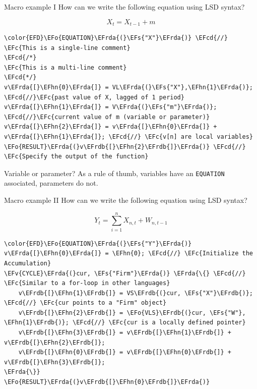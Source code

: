 \documentclass[bigger,aspectratio=169]{beamer}
\newcommand{\EFc}[1]{\textcolor{EFc}{#1}} %
\newcommand{\EFcd}[1]{\textcolor{EFcd}{#1}} %
\newcommand{\EFs}[1]{\textcolor{EFs}{#1}} %
\newcommand{\EFv}[1]{\textcolor{EFv}{#1}} %
\newcommand{\EFo}[1]{\textcolor{EFo}{#1}} %
\newcommand{\EFhn}[1]{\textcolor{EFhn}{\textbf{#1}}} %
\newcommand{\EFrda}[1]{\textcolor{EFrda}{#1}} %
\newcommand{\EFrdb}[1]{\textcolor{EFrdb}{#1}} %
\begin{document}
\begin{frame}[label={sec:org2e52cb0},fragile]{Macro example I}
 How can we write the following equation using LSD syntax?

\[X_{t} = X_{t-1} + m\]

\begin{Code}
\begin{Verbatim}
\color{EFD}\EFo{EQUATION}\EFrda{(}\EFs{"X"}\EFrda{)} \EFcd{//} \EFc{This is a single-line comment}
\EFcd{/*}
\EFc{This is a multi-line comment}
\EFcd{*/}
v\EFrda{[}\EFhn{0}\EFrda{]} = VL\EFrda{(}\EFs{"X"},\EFhn{1}\EFrda{)}; \EFcd{//}\EFc{past value of X, lagged of 1 period}
v\EFrda{[}\EFhn{1}\EFrda{]} = V\EFrda{(}\EFs{"m"}\EFrda{)}; \EFcd{//}\EFc{current value of m (variable or parameter)}
v\EFrda{[}\EFhn{2}\EFrda{]} = v\EFrda{[}\EFhn{0}\EFrda{]} + v\EFrda{[}\EFhn{1}\EFrda{]}; \EFcd{//} \EFc{v[n] are local variables}
\EFo{RESULT}\EFrda{(}v\EFrdb{[}\EFhn{2}\EFrdb{]}\EFrda{)} \EFcd{//} \EFc{Specify the output of the function}
\end{Verbatim}
\end{Code}
\begin{block}{Variable or parameter?}
As a rule of thumb, variables have an \texttt{EQUATION} associated, parameters do not.
\end{block}
\end{frame}
\begin{frame}[label={sec:orgbe21d23},fragile]{Macro example II}
 How can we write the following equation using LSD syntax?

\[Y_{t} = \sum_{i=1}^{n} X_{n,t} + W_{n,t-1}\]



\begin{Code}
\begin{Verbatim}
\color{EFD}\EFo{EQUATION}\EFrda{(}\EFs{"Y"}\EFrda{)}
v\EFrda{[}\EFhn{0}\EFrda{]} = \EFhn{0}; \EFcd{//} \EFc{Initialize the Accumulation}
\EFv{CYCLE}\EFrda{(}cur, \EFs{"Firm"}\EFrda{)} \EFrda{\{} \EFcd{//} \EFc{Similar to a for-loop in other languages}
    v\EFrdb{[}\EFhn{1}\EFrdb{]} = VS\EFrdb{(}cur, \EFs{"X"}\EFrdb{)}; \EFcd{//} \EFc{cur points to a "Firm" object}
    v\EFrdb{[}\EFhn{2}\EFrdb{]} = \EFo{VLS}\EFrdb{(}cur, \EFs{"W"}, \EFhn{1}\EFrdb{)}; \EFcd{//} \EFc{cur is a locally defined pointer}
    v\EFrdb{[}\EFhn{3}\EFrdb{]} = v\EFrdb{[}\EFhn{1}\EFrdb{]} + v\EFrdb{[}\EFhn{2}\EFrdb{]};
    v\EFrdb{[}\EFhn{0}\EFrdb{]} = v\EFrdb{[}\EFhn{0}\EFrdb{]} + v\EFrdb{[}\EFhn{3}\EFrdb{]};
\EFrda{\}}
\EFo{RESULT}\EFrda{(}v\EFrdb{[}\EFhn{0}\EFrdb{]}\EFrda{)}
\end{Verbatim}
\end{Code}
\end{frame}
\end{document}
